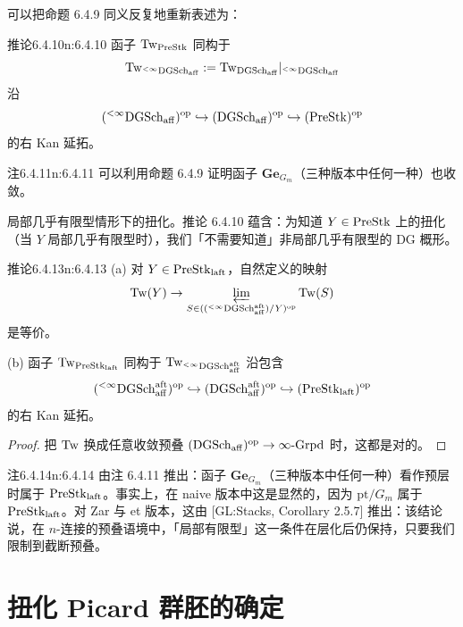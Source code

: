可以把命题 6.4.9 同义反复地重新表述为：

\begin{othm}{推论}{6.4.10}{n:6.4.10}
函子 $\mathrm{Tw}_{\mathrm{PreStk}}$ 同构于
\[
\mathrm{Tw}_{{}^{<\infty}\mathrm{DGSch}_{\mathrm{aff}}}:=\mathrm{Tw}_{\mathrm{DGSch}_{\mathrm{aff}}}|_{{}^{<\infty}\mathrm{DGSch}_{\mathrm{aff}}}
\]
沿
\[
({}^{<\infty}\mathrm{DGSch}_{\mathrm{aff}})^{\mathrm{op}}\hookrightarrow(\mathrm{DGSch}_{\mathrm{aff}})^{\mathrm{op}}\hookrightarrow(\mathrm{PreStk})^{\mathrm{op}}
\]
的右 Kan 延拓。
\end{othm}

\begin{othm}{注}{6.4.11}{n:6.4.11}
可以利用命题 6.4.9 证明函子 $\mathbf{Ge}_{G_m}$（三种版本中任何一种）也收敛。
\end{othm}

局部几乎有限型情形下的扭化。推论 6.4.10 蕴含：为知道 $Y\in\mathrm{PreStk}$ 上的扭化（当 $Y$ 局部几乎有限型时），我们「不需要知道」非局部几乎有限型的 DG 概形。

\begin{othm}{推论}{6.4.13}{n:6.4.13}
(a) 对 $Y\in\mathrm{PreStk}_{\mathrm{laft}}$，自然定义的映射
\[
\mathrm{Tw}(Y)\to\varprojlim_{S\in(({}^{<\infty}\mathrm{DGSch}_{\mathrm{aff}}^{\mathrm{aft}})/Y)^{\mathrm{op}}}\mathrm{Tw}(S)
\]
是等价。

(b) 函子 $\mathrm{Tw}_{\mathrm{PreStk}_{\mathrm{laft}}}$ 同构于 $\mathrm{Tw}_{{}^{<\infty}\mathrm{DGSch}_{\mathrm{aff}}^{\mathrm{aft}}}$ 沿包含
\[
({}^{<\infty}\mathrm{DGSch}_{\mathrm{aff}}^{\mathrm{aft}})^{\mathrm{op}}\hookrightarrow(\mathrm{DGSch}_{\mathrm{aff}}^{\mathrm{aft}})^{\mathrm{op}}\hookrightarrow(\mathrm{PreStk}_{\mathrm{laft}})^{\mathrm{op}}
\]
的右 Kan 延拓。
\end{othm}

\begin{proof}
把 $\mathrm{Tw}$ 换成任意收敛预叠 $(\mathrm{DGSch}_{\mathrm{aff}})^{\mathrm{op}}\to\infty\text{-}\mathrm{Grpd}$ 时，这都是对的。
\end{proof}

\begin{othm}{注}{6.4.14}{n:6.4.14}
由注 6.4.11 推出：函子 $\mathbf{Ge}_{G_m}$（三种版本中任何一种）看作预层时属于 $\mathrm{PreStk}_{\mathrm{laft}}$。事实上，在 naive 版本中这是显然的，因为 $\mathrm{pt}/G_m$ 属于 $\mathrm{PreStk}_{\mathrm{laft}}$。对 Zar 与 et 版本，这由 [GL:Stacks, Corollary 2.5.7] 推出：该结论说，在 $n$-连接的预叠语境中，「局部有限型」这一条件在层化后仍保持，只要我们限制到截断预叠。
\end{othm}

\section{扭化 Picard 群胚的确定}

